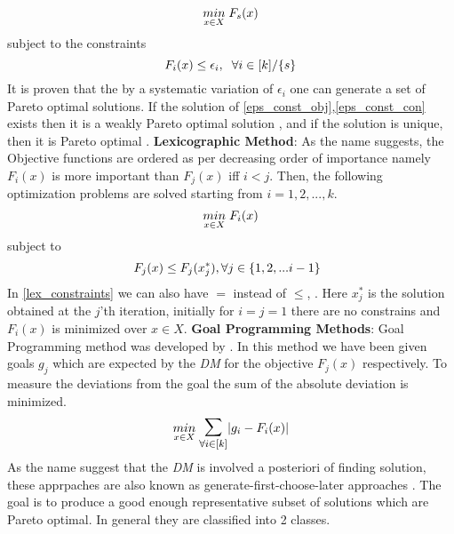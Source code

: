 \begin{equation}\label{eps_const_obj}
    \underset{x \in X}{min}\hspace{1mm} F_s(x)
\end{equation}
\newline subject to the constraints
\begin{equation}\label{eps_const_con}
    F_i(x) \le \epsilon_i,\hspace{2mm} \forall i \in [k]/\{s\}
\end{equation}\newline
It is proven that the by a systematic variation of $\epsilon_i$ one can generate a set of Pareto optimal solutions\cite{hwang1979methods}.
If the solution of \ref{eps_const_obj},\ref{eps_const_con} exists then it is a weakly Pareto optimal solution \cite{miettinen2012nonlinear}, and if the solution is unique, then it is Pareto optimal \cite{miettinen2012nonlinear}.
\newline \newline \textbf{Lexicographic Method}: As the name suggests, the Objective functions are ordered as per decreasing order of importance namely $F_i(x)$ is more important than $F_j(x)$ iff $i<j$. Then, the following optimization problems are solved starting from $i=1,2,...,k$.
\begin{equation} \label{lex_obj}
    \underset{x\in X}{min}\hspace{1mm} F_i(x)
\end{equation}
\newline subject to
\begin{equation} \label{lex_constraints}
    F_j(x) \le F_j(x^{*}_j), \forall j \in \{1,2,...i-1\}\hspace{2mm}
\end{equation}
\newline In \ref{lex_constraints} we can also have $=$ instead of $\le$, \cite{stadler1988multicriteria}. Here $x^{*}_j$ is the solution obtained at the $j$'th iteration, initially for $i=j=1$ there are no constrains and $F_i(x)$ is minimized over $x\in X$. 
\newline \newline \textbf{Goal Programming Methods}: Goal Programming method was developed by \cite{charnes1955optimal}\cite{ijiri1965management}\cite{charnes1967effective}. In this method we have been given goals $g_j$ which are expected by the \textit{DM} for the objective $F_j(x)$ respectively. To measure the deviations from the goal the sum of the absolute deviation is minimized. 
\begin{equation}
    \underset{x\in X}{min} \hspace{1mm}\mathlarger{\mathlarger{\sum}}_{\forall i\in [k]} |g_i - F_i(x)|
\end{equation}
 \label{a_posteriori_method}
As the name suggest that the \textit{DM} is involved a posteriori of finding solution, these apprpaches are also known as generate-first-choose-later approaches \cite{messac2002generating}. The goal is to produce a good enough representative subset of solutions which are Pareto optimal. In general they are classified into 2 classes.

